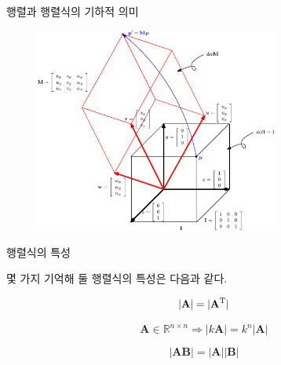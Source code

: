 \documentclass{beamer}
\begin{document}
\begin{frame}{행렬과 행렬식의 기하적 의미}

\begin{figure}
\includegraphics[width=8cm]{Math_matrix/matrixConcept.eps}
\end{figure}

\end{frame}

\begin{frame}{행렬식의 특성}

몇 가지 기억해 둘 행렬식의 특성은 다음과 같다.

$$|\mathbf A| = |\mathbf A^{\rm T}|$$

$$\mathbf A \in \mathbb R^{n \times n} \Rightarrow | k \mathbf A | = k^n |\mathbf A|$$

$$|\mathbf {AB}| = |\mathbf A| |\mathbf B|$$

\end{frame}
\end{document}
